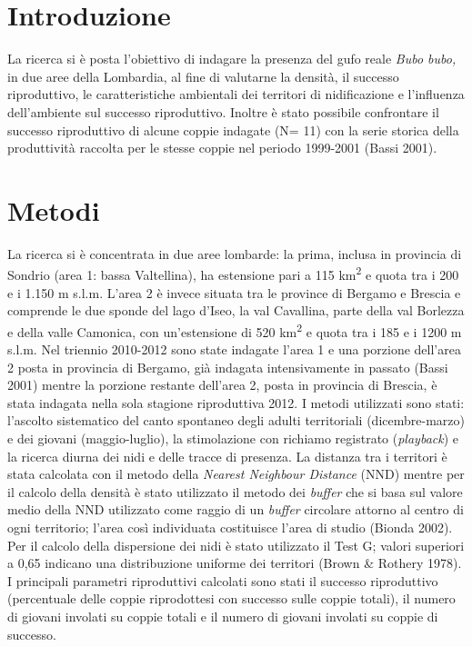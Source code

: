 \section*{Introduzione}

La ricerca si \`e posta l{\textquoteright}obiettivo di indagare la
presenza del gufo reale \textit{Bubo bubo,} in due aree della
Lombardia, al fine di valutarne la densit\`a, il successo riproduttivo,
le caratteristiche ambientali dei territori di nidificazione e
l{\textquoteright}influenza dell{\textquoteright}ambiente sul successo
riproduttivo. Inoltre \`e stato possibile confrontare il successo
riproduttivo di alcune coppie indagate (N= 11) con la serie storica
della produttivit\`a raccolta per le stesse coppie nel periodo
1999-2001 (Bassi 2001).

\section*{Metodi}

La ricerca si \`e concentrata in due aree lombarde: la prima, inclusa in
provincia di Sondrio (area 1: bassa Valtellina), ha estensione pari a
115 km\textsuperscript{2} e quota tra i 200 e i 1.150 m s.l.m.
L{\textquoteright}area 2 \`e invece situata tra le province di Bergamo
e Brescia e comprende le due sponde del lago d{\textquoteright}Iseo, la
val Cavallina, parte della val Borlezza e della valle Camonica, con
un{\textquoteright}estensione di 520 km\textsuperscript{2} e quota tra
i 185 e i 1200 m s.l.m. Nel triennio 2010-2012 sono state indagate
l{\textquoteright}area 1 e una porzione dell{\textquoteright}area 2
posta in provincia di Bergamo, gi\`a indagata intensivamente in passato
(Bassi 2001) mentre la porzione restante dell{\textquoteright}area 2,
posta in provincia di Brescia, \`e stata indagata nella sola stagione
riproduttiva 2012. I metodi utilizzati sono stati:
l{\textquoteright}ascolto sistematico del canto spontaneo degli adulti
territoriali (dicembre-marzo) e dei giovani (maggio-luglio), la
stimolazione con richiamo registrato (\textit{playback}) e la ricerca
diurna dei nidi e delle tracce di presenza. La distanza tra i territori
\`e stata calcolata con il metodo della \textit{Nearest Neighbour
Distance }(NND) mentre per il calcolo della densit\`a \`e stato
utilizzato il metodo dei \textit{buffer} che si basa sul valore medio
della NND utilizzato come raggio di un \textit{buffer }circolare
attorno al centro di ogni territorio; l{\textquoteright}area cos\`i
individuata costituisce l{\textquoteright}area di studio (Bionda 2002).
Per il calcolo della dispersione dei nidi \`e stato utilizzato il Test
G; valori superiori a 0,65 indicano una distribuzione uniforme dei
territori (Brown \& Rothery 1978). I principali parametri riproduttivi
calcolati sono stati il successo riproduttivo (percentuale delle coppie
riprodottesi con successo sulle coppie totali), il numero di giovani
involati su coppie totali e il numero di giovani involati su coppie di
successo.

